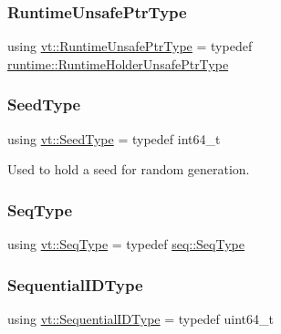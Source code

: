 \subsubsection{\texorpdfstring{Runtime\+Unsafe\+Ptr\+Type}{RuntimeUnsafePtrType}}
{\footnotesize\ttfamily using \hyperlink{namespacevt_a8019b70cc4b9b0833c38559c85dfd53b}{vt\+::\+Runtime\+Unsafe\+Ptr\+Type} = typedef \hyperlink{namespacevt_1_1runtime_a69931905b04961a874e4a70a43083a83}{runtime\+::\+Runtime\+Holder\+Unsafe\+Ptr\+Type}}

\mbox{\label{namespacevt_ae2e13198bdef4d5b8e603d6c1c7f0969}} 
\subsubsection{\texorpdfstring{Seed\+Type}{SeedType}}
{\footnotesize\ttfamily using \hyperlink{namespacevt_ae2e13198bdef4d5b8e603d6c1c7f0969}{vt\+::\+Seed\+Type} = typedef int64\+\_\+t}



Used to hold a seed for random generation. 

\mbox{\label{namespacevt_a98ecd5e376bd317a21b245064361240e}} 
\subsubsection{\texorpdfstring{Seq\+Type}{SeqType}}
{\footnotesize\ttfamily using \hyperlink{namespacevt_a98ecd5e376bd317a21b245064361240e}{vt\+::\+Seq\+Type} = typedef \hyperlink{namespacevt_1_1seq_a3b612da217ac669d39c159f134ab8434}{seq\+::\+Seq\+Type}}

\mbox{\label{namespacevt_a3063d4db3b879d6dd2c7b8d50995c7f6}} 
\subsubsection{\texorpdfstring{Sequential\+I\+D\+Type}{SequentialIDType}}
{\footnotesize\ttfamily using \hyperlink{namespacevt_a3063d4db3b879d6dd2c7b8d50995c7f6}{vt\+::\+Sequential\+I\+D\+Type} = typedef uint64\+\_\+t}



